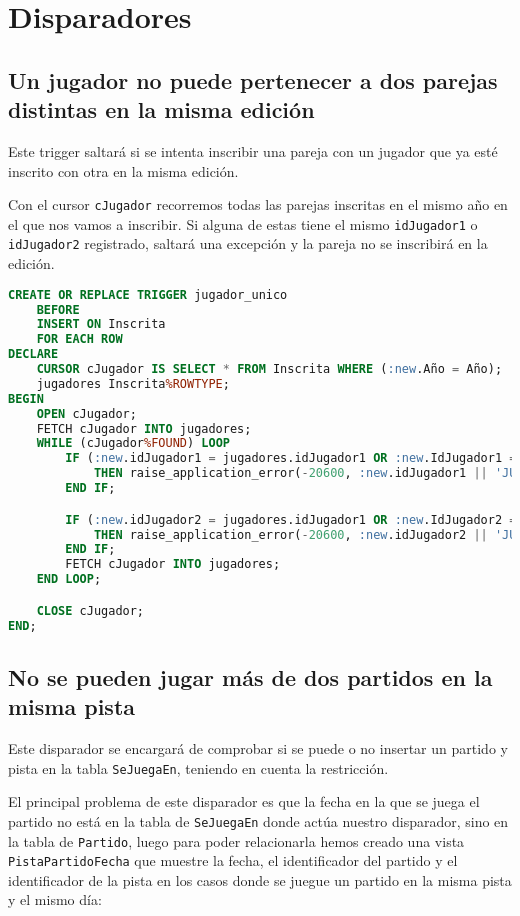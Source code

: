 \section{Disparadores}

\subsection{Un jugador no puede pertenecer a dos parejas distintas en la misma edición}
Este trigger saltará si se intenta inscribir una pareja con un jugador que ya esté
inscrito con otra en la misma edición.

Con el cursor \texttt{cJugador} recorremos todas las parejas inscritas en el
mismo año en el que nos vamos a inscribir. Si alguna de estas tiene el mismo
\texttt{idJugador1} o \texttt{idJugador2} registrado, saltará una excepción y
la pareja no se inscribirá en la edición.

\begin{lstlisting}[language=sql]
CREATE OR REPLACE TRIGGER jugador_unico
	BEFORE
	INSERT ON Inscrita
	FOR EACH ROW
DECLARE
	CURSOR cJugador IS SELECT * FROM Inscrita WHERE (:new.Año = Año);
	jugadores Inscrita%ROWTYPE;
BEGIN
	OPEN cJugador;
	FETCH cJugador INTO jugadores;
	WHILE (cJugador%FOUND) LOOP
		IF (:new.idJugador1 = jugadores.idJugador1 OR :new.IdJugador1 = jugadores.idJugador2)
			THEN raise_application_error(-20600, :new.idJugador1 || 'JUGADOR 1: No se puede pertenecer a más de una pareja en la misma edicion');
		END IF;

		IF (:new.idJugador2 = jugadores.idJugador1 OR :new.IdJugador2 = jugadores.idJugador2)
			THEN raise_application_error(-20600, :new.idJugador2 || 'JUGADOR 2: No se puede pertenecer a más de una pareja en la misma edicion');
		END IF;
		FETCH cJugador INTO jugadores;
	END LOOP;

	CLOSE cJugador;
END;
\end{lstlisting}

\subsection{No se pueden jugar más de dos partidos en la misma pista}
Este disparador se encargará de comprobar si se puede o no insertar un partido
y pista en la tabla \texttt{SeJuegaEn}, teniendo en cuenta la restricción.

El principal problema de este disparador es que la fecha en la que se juega el
partido no está en la tabla de \texttt{SeJuegaEn} donde actúa nuestro disparador,
sino en la tabla de \texttt{Partido}, luego para poder relacionarla hemos creado
una vista \texttt{PistaPartidoFecha} que muestre la fecha, el identificador del
partido y el identificador de la pista en los casos donde se juegue un partido en
la misma pista y el mismo día:

